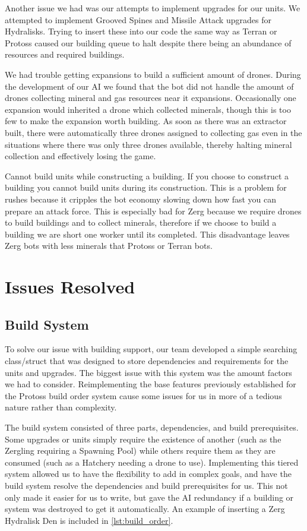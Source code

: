 \documentclass{article}
\begin{document}
Another issue we had was our attempts to implement upgrades for our units. We attempted to implement Grooved Spines and Missile Attack upgrades for Hydralisks. Trying to insert these into our code the same way as Terran or Protoss caused our building queue to halt despite there being an abundance of resources and required buildings.

We had trouble getting expansions to build a sufficient amount of drones. During the development of our AI we found that the bot did not handle the amount of drones collecting mineral and gas resources near it expansions. Occasionally one expansion would inherited a drone which collected minerals, though this is too few to make the expansion worth building. As soon as there was an extractor built, there were automatically three drones assigned to collecting gas even in the situations where there was only three drones available, thereby halting mineral collection and effectively losing the game.

Cannot build units while constructing a building. If you choose to construct a building you cannot build units during its construction. This is a problem for rushes because it cripples the bot economy slowing down how fast you can prepare an attack force. This is especially bad for Zerg because we require drones to build buildings and to collect minerals, therefore if we choose to build a building we are short one worker until its completed. This disadvantage leaves Zerg bots with less minerals that Protoss or Terran bots.

\section{Issues Resolved}

\subsection{Build System}
To solve our issue with building support, our team developed a simple searching class/struct that was designed to store dependencies and requirements for the units and upgrades. The biggest issue with this system was the amount factors we had to consider. Reimplementing the base features previously established for the Protoss build order system cause some issues for us in more of a tedious nature rather than complexity.

The build system consisted of three parts, dependencies, and build prerequisites. Some upgrades or units simply require the existence of another (such as the Zergling requiring a Spawning Pool) while others require them as they are consumed (such as a Hatchery needing a drone to use). Implementing this tiered system allowed us to have the flexibility to add in complex goals, and have the build system resolve the dependencies and build prerequisites for us. This not only made it easier for us to write, but gave the AI redundancy if a building or system was destroyed to get it automatically. An example of inserting a Zerg Hydralisk Den is included in \autoref{lst:build_order}.
\end{document}
